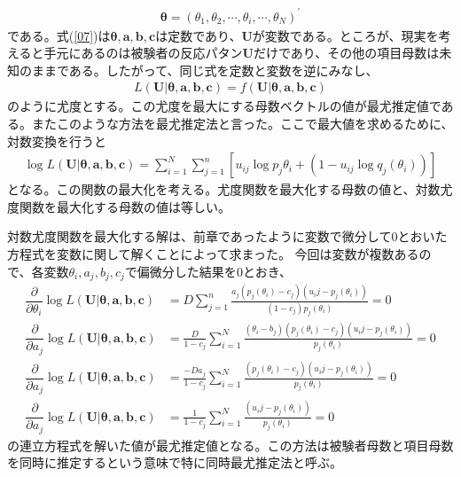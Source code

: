\documentclass[12pt]{jarticle}
\begin{document}
\begin{align}
  \label{08}
  \displaystyle \boldsymbol{\theta} = (\theta_1,\theta_2,\cdots,\theta_i,\cdots,\theta_N)^{\prime} \tag{4.8}
\end{align}
である。式(\ref{07})は$\boldsymbol{\theta},\boldsymbol{a},\boldsymbol{b},\boldsymbol{c}$は定数であり、$\boldsymbol{U}$が変数である。ところが、現実を考えると手元にあるのは被験者の反応パタン$\boldsymbol{U}$だけであり、その他の項目母数は未知のままである。したがって、同じ式を定数と変数を逆にみなし、
\begin{align}
  \label{09}
  \displaystyle L(\boldsymbol{U}|\boldsymbol{\theta},\boldsymbol{a},\boldsymbol{b},\boldsymbol{c}) = f(\boldsymbol{U}|\boldsymbol{\theta},\boldsymbol{a},\boldsymbol{b},\boldsymbol{c}) \tag{4.9}
\end{align}
のように尤度とする。この尤度を最大にする母数ベクトルの値が最尤推定値である。またこのような方法を最尤推定法と言った。ここで最大値を求めるために、対数変換を行うと
\begin{align}
  \label{10}
  \displaystyle \log L(\boldsymbol{U}|\boldsymbol{\theta},\boldsymbol{a},\boldsymbol{b},\boldsymbol{c}) = \sum_{i = 1}^{N} \sum_{j = 1}^{n} [u_{ij} \log p_j{\theta_i} + (1 - u_{ij} \log q_j(\theta_i))]     \tag{4.10}
\end{align}
となる。この関数の最大化を考える。尤度関数を最大化する母数の値と、対数尤度関数を最大化する母数の値は等しい。

対数尤度関数を最大化する解は、前章であったように変数で微分して$0$とおいた方程式を変数に関して解くことによって求まった。
今回は変数が複数あるので、各変数$\theta_i,a_j,b_j,c_j$で偏微分した結果を$0$とおき、
\begin{align}
  \label{11}
  \displaystyle \dfrac{\partial }{\partial \theta_i} \log L(\boldsymbol{U}|\boldsymbol{\theta},\boldsymbol{a},\boldsymbol{b},\boldsymbol{c}) &= D\sum_{j = 1}^{n} \frac{a_j(p_j(\theta_i) - c_j)(u_ij - p_j(\theta_i))}{(1 - c_j)p_j(\theta_i)}=0    \tag{4.11} \\
  \displaystyle \dfrac{\partial }{\partial a_j} \log L(\boldsymbol{U}|\boldsymbol{\theta},\boldsymbol{a},\boldsymbol{b},\boldsymbol{c}) &= \frac{D}{1 - c_j}\sum_{i = 1}^{N} \frac{(\theta_i - b_j)(p_j(\theta_i) - c_j)(u_ij - p_j(\theta_i))}{p_j(\theta_i)}=0    \tag{4.12}\\
  \displaystyle \dfrac{\partial }{\partial a_j} \log L(\boldsymbol{U}|\boldsymbol{\theta},\boldsymbol{a},\boldsymbol{b},\boldsymbol{c}) &= \frac{-Da_j}{1 - c_j}\sum_{i = 1}^{N} \frac{(p_j(\theta_i) - c_j)(u_ij - p_j(\theta_i))}{p_j(\theta_i)}=0    \tag{4.13} \\
  \displaystyle \dfrac{\partial }{\partial a_j} \log L(\boldsymbol{U}|\boldsymbol{\theta},\boldsymbol{a},\boldsymbol{b},\boldsymbol{c}) &= \frac{1}{1 - c_j}\sum_{i = 1}^{N} \frac{(u_ij - p_j(\theta_i))}{p_j(\theta_i)}=0    \tag{4.13}
\end{align}
の連立方程式を解いた値が最尤推定値となる。この方法は被験者母数と項目母数を同時に推定するという意味で特に同時最尤推定法と呼ぶ。
\end{document}
